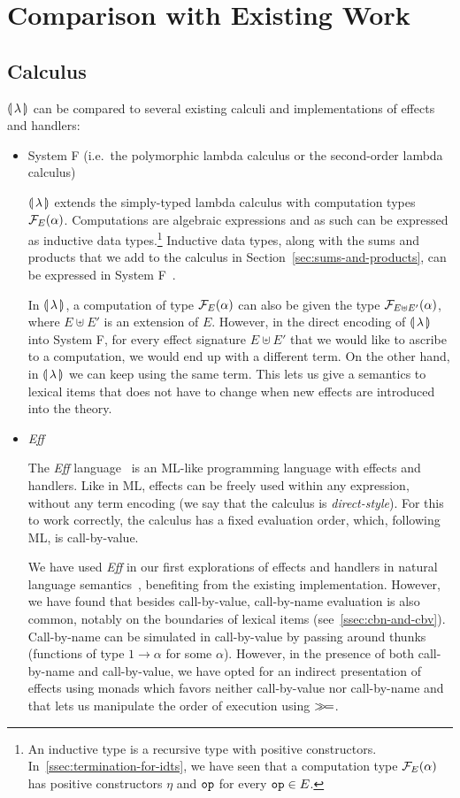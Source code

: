 \section{Comparison with Existing Work}

\subsection{Calculus}

${\llparenthesis \, \lambda \, \rrparenthesis}$ can be compared to several existing calculi and implementations of
effects and handlers:

\begin{itemize}
\item System F (i.e.\ the polymorphic lambda calculus or the second-order
  lambda calculus)

  ${\llparenthesis \, \lambda \, \rrparenthesis}$ extends the simply-typed lambda calculus with computation types
  $\mathcal{F}_E(\alpha)$. Computations are algebraic expressions and as such can
  be expressed as inductive data types.\footnote{An inductive type is a
    recursive type with positive
    constructors. In~\ref{ssec:termination-for-idts}, we have seen that a
    computation type $\mathcal{F}_E(\alpha)$ has positive constructors $\eta$ and
    $\mathtt{op}$ for every $\mathtt{op} \in E$.} Inductive data types, along with
  the sums and products that we add to the calculus in
  Section~\ref{sec:sums-and-products}, can be expressed in System
  F~\cite{wadler1990recursive}.

  In ${\llparenthesis \, \lambda \, \rrparenthesis}$, a computation of type $\mathcal{F}_E(\alpha)$ can also be given the
  type $\mathcal{F}_{E \uplus E'}(\alpha)$, where $E \uplus E'$ is an extension of
  $E$. However, in the direct encoding of ${\llparenthesis \, \lambda \, \rrparenthesis}$ into System F, for every
  effect signature $E \uplus E'$ that we would like to ascribe to a
  computation, we would end up with a different term. On the other hand, in
  ${\llparenthesis \, \lambda \, \rrparenthesis}$ we can keep using the same term. This lets us give a semantics to
  lexical items that does not have to change when new effects are
  introduced into the theory.

\item \emph{Eff}

  The \emph{Eff} language~\cite{bauer2012programming} is an ML-like
  programming language with effects and handlers. Like in ML, effects can
  be freely used within any expression, without any term encoding (we say
  that the calculus is \emph{direct-style}). For this to work correctly,
  the calculus has a fixed evaluation order, which, following ML, is
  call-by-value.

  We have used \emph{Eff} in our first explorations of effects and handlers
  in natural language semantics~\cite{marsik2014algebraic}, benefiting from
  the existing implementation. However, we have found that besides
  call-by-value, call-by-name evaluation is also common, notably on the
  boundaries of lexical items (see~\ref{ssec:cbn-and-cbv}). Call-by-name
  can be simulated in call-by-value by passing around thunks (functions of
  type $1 \to \alpha$ for some $\alpha$). However, in the presence of both
  call-by-name and call-by-value, we have opted for an indirect
  presentation of effects using monads which favors neither call-by-value
  nor call-by-name and that lets us manipulate the order of execution using
  $\mathbin{\gg\!=}$.


\end{itemize}
